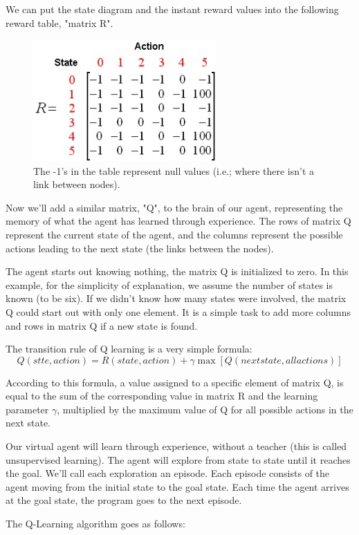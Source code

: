 \documentclass[a4paper, 11pt]{article}
\begin{document}
We can put the state diagram and the instant reward values into the following reward table, "matrix R".

\begin{figure}[ht]
\centering
\includegraphics[width=7cm]{Pic/r_matrix1}
\caption*{The -1's in the table represent null values (i.e.; where there isn't a link between nodes). }
\end{figure}

Now we'll add a similar matrix, "Q", to the brain of our agent, representing the memory of what the agent has learned through experience.  The rows of matrix Q represent the current state of the agent, and the columns represent the possible actions leading to the next state (the links between the nodes).

The agent starts out knowing nothing, the matrix Q is initialized to zero.  In this example, for the simplicity of explanation, we assume the number of states is known (to be six).  If we didn't know how many states were involved, the matrix Q could start out with only one element.  It is a simple task to add more columns and rows in matrix Q if a new state is found.

The transition rule of Q learning is a very simple formula:
$$Q(stte,action)=R(state,action)+\gamma\max[Q(next state,allactions)]$$

According to this formula, a value assigned to a specific element of matrix Q, is equal to the sum of the corresponding value in matrix R and the learning parameter $\gamma$, multiplied by the maximum value of Q for all possible actions in the next state. 

Our virtual agent will learn through experience, without a teacher (this is called unsupervised learning).  The agent will explore from state to state until it reaches the goal. We'll call each exploration an episode.  Each episode consists of the agent moving from the initial state to the goal state.  Each time the agent arrives at the goal state, the program goes to the next episode. 

The Q-Learning algorithm goes as follows:
\end{document}
